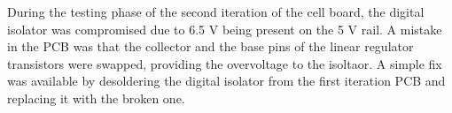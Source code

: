 
During the testing phase of the second iteration of the cell board, the digital 
isolator was compromised due to 6.5 V being present on the 5 V rail. A mistake in 
the PCB was that the collector and the base pins of the linear regulator transistors
were swapped, providing the overvoltage to the isoltaor. A simple fix was available 
by desoldering the digital isolator from the first iteration PCB and replacing it 
with the broken one. 
